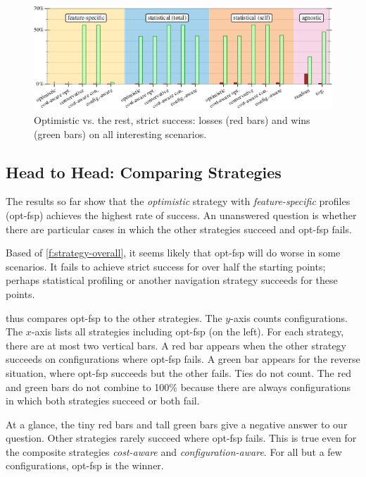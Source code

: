 \begin{figure}[ht]
  \includegraphics[width=0.9\columnwidth]{data/head-to-head.pdf}
  \caption{Optimistic vs. the rest, strict success: losses (red bars) and wins (green bars) on all interesting scenarios.}
  \label{f:head-to-head}
\end{figure}

\subsection{Head to Head: Comparing Strategies}
\label{s:hh}

The results so far show that the \emph{optimistic} strategy
with \emph{feature-specific} profiles (opt-fsp) achieves the highest rate
of success.
An unanswered question is whether there are particular cases in which
the other strategies succeed and opt-fsp fails.

Based of \cref{f:strategy-overall}, it seems likely that opt-fsp will do
worse in some scenarios.
It fails to achieve strict success for over half the starting points;
perhaps statistical profiling or another navigation strategy succeeds
for these points.

 thus compares opt-fsp to the other strategies.
The $y$-axis counts configurations.
The $x$-axis lists all strategies including opt-fsp (on the left).
For each strategy, there are at most two vertical bars.
A red bar appears when the other strategy succeeds on configurations
where opt-fsp fails.
A green bar appears for the reverse situation, where opt-fsp succeeds
but the other fails.
Ties do not count.
The red and green bars do not combine to 100\% because there are always configurations
in which both strategies succeed or both fail.

At a glance, the tiny red bars and tall green bars give a negative answer to our question.
Other strategies rarely succeed where opt-fsp fails.
This is true even for the composite strategies \emph{cost-aware} and \emph{configuration-aware}.
For all but a few configurations, opt-fsp is the winner.

